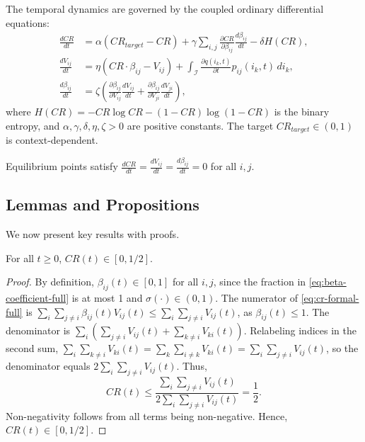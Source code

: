 The temporal dynamics are governed by the coupled ordinary differential equations:
\begin{align}
	\frac{dCR}{dt} &= \alpha (CR_{target} - CR) + \gamma \sum_{i,j} \frac{\partial CR}{\partial \beta_{ij}} \frac{d\beta_{ij}}{dt} - \delta H(CR), \label{eq:cr-dynamics-full}\\
	\frac{dV_{ij}}{dt} &= \eta (CR \cdot \beta_{ij} - V_{ij}) + \int_{\mathcal{I}} \frac{\partial q(i_k, t)}{\partial t} p_{ij}(i_k, t) \, di_k, \label{eq:v-dynamics-full}\\
	\frac{d\beta_{ij}}{dt} &= \zeta \left( \frac{\partial \beta_{ij}}{\partial V_{ij}} \frac{dV_{ij}}{dt} + \frac{\partial \beta_{ij}}{\partial V_{ji}} \frac{dV_{ji}}{dt} \right), \label{eq:beta-dynamics-full}
\end{align}
where \(H(CR) = -CR \log CR - (1-CR) \log(1-CR)\) is the binary entropy, and \(\alpha, \gamma, \delta, \eta, \zeta > 0\) are positive constants. The target \(CR_{target} \in (0,1)\) is context-dependent.

Equilibrium points satisfy \(\frac{dCR}{dt} = \frac{dV_{ij}}{dt} = \frac{d\beta_{ij}}{dt} = 0\) for all \(i,j\).

\subsection{Lemmas and Propositions}

We now present key results with proofs.

\begin{lemma} 
	\label{lem:boundedness-cr}
	For all \(t \geq 0\), \(CR(t) \in [0,1/2]\).
\end{lemma}

\begin{proof}
	By definition, \(\beta_{ij}(t) \in [0,1]\) for all \(i,j\), since the fraction in \eqref{eq:beta-coefficient-full} is at most 1 and \(\sigma(\cdot) \in (0,1)\). The numerator of \eqref{eq:cr-formal-full} is \(\sum_{i} \sum_{j \neq i} \beta_{ij}(t) V_{ij}(t) \leq \sum_{i} \sum_{j \neq i} V_{ij}(t)\), as \(\beta_{ij}(t) \leq 1\). The denominator is \(\sum_{i} \left( \sum_{j \neq i} V_{ij}(t) + \sum_{k \neq i} V_{ki}(t) \right)\). Relabeling indices in the second sum, \(\sum_{i} \sum_{k \neq i} V_{ki}(t) = \sum_{k} \sum_{i \neq k} V_{ki}(t) = \sum_{i} \sum_{j \neq i} V_{ij}(t)\), so the denominator equals \(2 \sum_{i} \sum_{j \neq i} V_{ij}(t)\). Thus,
	\[
	CR(t) \leq \frac{\sum_{i} \sum_{j \neq i} V_{ij}(t)}{2 \sum_{i} \sum_{j \neq i} V_{ij}(t)} = \frac{1}{2}.
	\]
	Non-negativity follows from all terms being non-negative. Hence, \(CR(t) \in [0,1/2]\).
\end{proof}

